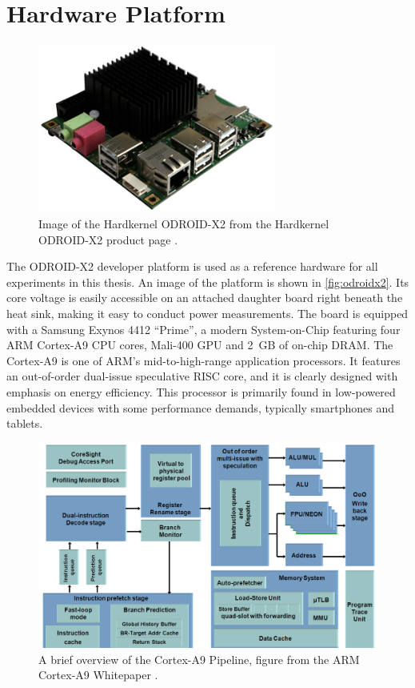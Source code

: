 \section{Hardware Platform}

\begin{figure}[bth]
    \centering
    \includegraphics[width=0.7\textwidth]{figs/odroid.jpg}
    \caption{Image of the Hardkernel ODROID-X2 from the Hardkernel ODROID-X2
    product page \cite{hardkernelodroidx2}.}
    \label{fig:odroidx2}
\end{figure}

The ODROID-X2 developer platform \cite{hardkernelodroidx2} is used as a
reference hardware for all experiments in this thesis. An image of the platform
is shown in \autoref{fig:odroidx2}. Its core voltage is easily accessible on an
attached daughter board right beneath the heat sink, making it easy to conduct
power measurements. The board is equipped with a Samsung Exynos 4412 ``Prime'',
a modern System-on-Chip featuring four ARM Cortex-A9 CPU cores, Mali-400 GPU and
2~GB of on-chip DRAM. The Cortex-A9 is one of ARM's mid-to-high-range application
processors. It features an out-of-order dual-issue speculative RISC core, and it
is clearly designed with emphasis on energy efficiency. This processor is
primarily found in low-powered embedded devices with some performance demands,
typically smartphones and tablets.

\begin{figure}[bht]
    \centering
    \includegraphics[width=\textwidth]{figs/A9-Pipeline-hres.jpg}
    \caption{A brief overview of the Cortex-A9 Pipeline, figure from the ARM
    Cortex-A9 Whitepaper \cite{a9whitepaper}.}
    \label{fig:a9arch}
\end{figure}

